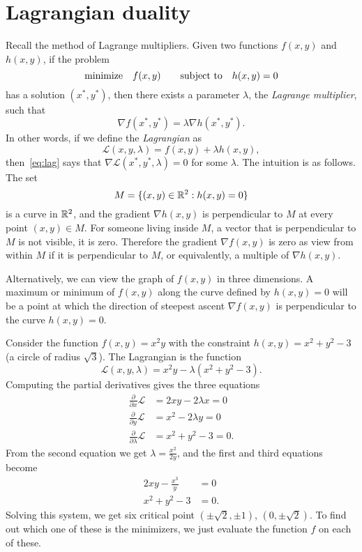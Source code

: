 \section{Lagrangian duality}
Recall the method of Lagrange multipliers. Given two functions $f(x,y)$ and $h(x,y)$, if the problem
\begin{equation*}
 \text{minimize}\quad f(x,y) \quad \quad\text{subject to}\quad h(x,y)=0
\end{equation*}
has a solution $(x^*,y^*)$, then there exists a parameter $\lambda$, the {\em Lagrange multiplier}, such that
\begin{equation}\label{eq:lag}
 \nabla f(x^*,y^*) = \lambda \nabla h(x^*,y^*).
\end{equation}
In other words, if we define the {\em Lagrangian} as 
\begin{equation*}
 \mathcal{L}(x,y,\lambda) = f(x,y)+\lambda h(x,y),
\end{equation*}
then~\eqref{eq:lag} says that $\nabla \mathcal{L}(x^*,y^*,\lambda) = 0$ for some $\lambda$. The intuition is as follows. The set
\begin{equation*}
 M = \{(x,y)\in \mathbb{R}^2 \mathrel{\mathop{:}} h(x,y)=0\}
\end{equation*}
is a curve in $\mathbb{R}^2$, and the gradient $\nabla h(x,y)$ is perpendicular to $M$ at every point $(x,y)\in M$. For someone living inside $M$, a vector that is perpendicular to $M$ is not visible, it is zero. Therefore the gradient $\nabla f(x,y)$ is zero as view from within $M$ if it is perpendicular to $M$, or equivalently, a multiple of $\nabla h(x,y)$.


Alternatively, we can view the graph of $f(x,y)$ in three dimensions. A maximum or minimum of $f(x,y)$ along the curve defined by $h(x,y)=0$ will be a point at which the direction of steepest ascent $\nabla f(x,y)$ is perpendicular to the curve $h(x,y)=0$.

\begin{example}
 Consider the function $f(x,y)=x^2y$ with the constraint $h(x,y)=x^2+y^2-3$ (a circle of radius $\sqrt{3}$). The Lagrangian is the function
 \begin{equation*}
  \mathcal{L}(x,y,\lambda) = x^2y-\lambda(x^2+y^2-3).
 \end{equation*}
Computing the partial derivatives gives the three equations
\begin{align*}
\frac{\partial}{\partial x} \mathcal{L} &= 2xy-2\lambda x = 0\\
\frac{\partial}{\partial y} \mathcal{L} &= x^2-2\lambda y = 0\\
\frac{\partial}{\partial \lambda} \mathcal{L} &= x^2+y^2-3 = 0.
\end{align*}
From the second equation we get $\lambda = \frac{x^2}{2y}$,
and the first and third equations become
\begin{align*}
 2xy-\frac{x^3}{y} &= 0\\
 x^2+y^2-3&=0.
\end{align*}
Solving this system, we get six critical point $(\pm \sqrt{2},\pm 1)$, $(0,\pm \sqrt{2})$. To find out which one of these is the minimizers, we just evaluate the function $f$ on each of these.
\end{example}


